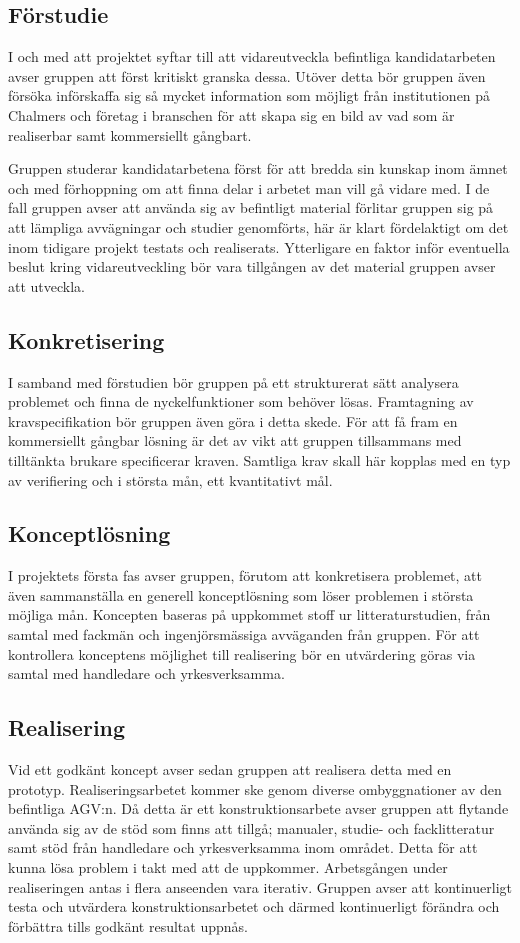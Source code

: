 \documentclass[a4paper,11pt]{article}
\begin{document}
\subsection{Förstudie}
I och med att projektet syftar till att vidareutveckla befintliga
kandidatarbeten avser gruppen att först kritiskt granska dessa. Utöver
detta bör gruppen även försöka införskaffa sig så mycket information som
möjligt från institutionen på Chalmers och företag i branschen för att
skapa sig en bild av vad som är realiserbar samt kommersiellt gångbart.

Gruppen studerar kandidatarbetena först för att bredda sin kunskap inom
ämnet och med förhoppning om att finna delar i arbetet man vill gå vidare
med. I de fall gruppen avser att använda sig av befintligt material
förlitar gruppen sig på att lämpliga avvägningar och studier genomförts,
här är klart fördelaktigt om det inom tidigare projekt testats och
realiserats. Ytterligare en faktor inför eventuella beslut kring
vidareutveckling bör vara tillgången av det material gruppen avser att
utveckla.

\subsection{Konkretisering}
I samband med förstudien bör gruppen på ett strukturerat sätt analysera
problemet och finna de nyckelfunktioner som behöver lösas. Framtagning av
kravspecifikation bör gruppen även göra i detta skede. För att få fram en
kommersiellt gångbar lösning är det av vikt att gruppen tillsammans med
tilltänkta brukare specificerar kraven. Samtliga krav skall här kopplas med
en typ av verifiering och i största mån, ett kvantitativt mål.

\subsection{Konceptlösning}
I projektets första fas avser gruppen, förutom att konkretisera problemet,
att även sammanställa en generell konceptlösning som löser problemen i
största möjliga mån. Koncepten baseras på uppkommet stoff ur
litteraturstudien, från samtal med fackmän och ingenjörsmässiga avväganden
från gruppen. För att kontrollera konceptens möjlighet till realisering bör
en utvärdering göras via samtal med handledare och yrkesverksamma.


\subsection{Realisering}
Vid ett godkänt koncept avser sedan gruppen att realisera detta med en
prototyp. Realiseringsarbetet kommer ske genom diverse ombyggnationer av
den befintliga AGV:n. Då detta är ett konstruktionsarbete avser gruppen att
flytande använda sig av de stöd som finns att tillgå; manualer, studie- och
facklitteratur samt stöd från handledare och yrkesverksamma inom området.
Detta för att kunna lösa problem i takt med att de uppkommer. Arbetsgången
under realiseringen antas i flera anseenden vara iterativ. Gruppen avser
att kontinuerligt testa och utvärdera konstruktionsarbetet och därmed
kontinuerligt förändra och förbättra tills godkänt resultat uppnås.
\end{document}
